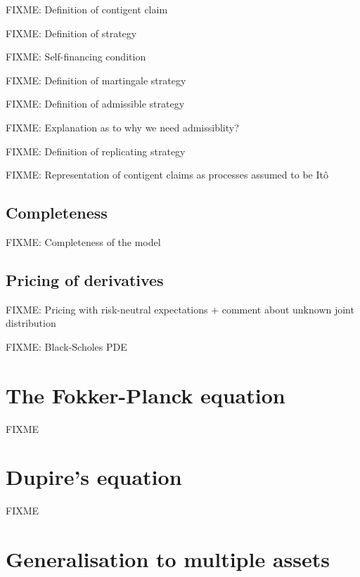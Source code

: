 \documentclass[a4paper]{article}
\begin{document}
FIXME: Definition of contigent claim

FIXME: Definition of strategy

FIXME: Self-financing condition

FIXME: Definition of martingale strategy

FIXME: Definition of admissible strategy

FIXME: Explanation as to why we need admissiblity?

FIXME: Definition of replicating strategy

FIXME: Representation of contigent claims as processes assumed to be It\^o

\subsection{Completeness}

FIXME: Completeness of the model

\subsection{Pricing of derivatives}

FIXME: Pricing with risk-neutral expectations + comment about unknown joint distribution

FIXME: Black-Scholes PDE

\section{The Fokker-Planck equation}


FIXME

\section{Dupire's equation}


FIXME

\section{Generalisation to multiple assets}

\end{document}
